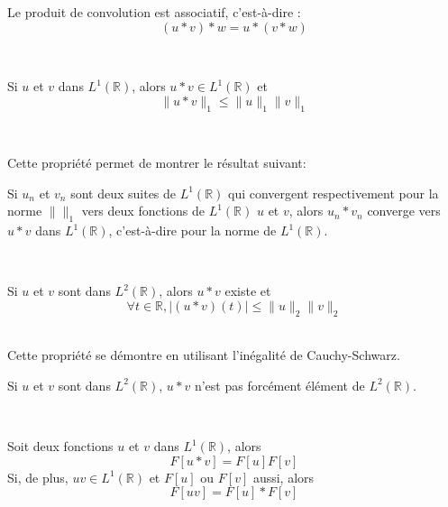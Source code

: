 \begin{prot} 
Le produit de convolution est associatif, c'est-à-dire :
$$(u*v)*w=u*(v*w)$$
\end{prot}
~~\

\begin{prot} 
Si $u$ et $v$ dans $L^1(\mathbb{R})$, alors $u*v \in L^1(\mathbb{R})$ et 
$$\|u*v\|_1\leq \|u\|_1 \|v\|_1$$
\end{prot}
~~\

Cette propriété permet de montrer le résultat suivant:

\begin{prot} 
Si $u_n$ et $v_n$ sont deux suites de $L^1(\mathbb{R})$ qui convergent respectivement pour la norme $\| \|_1$ vers deux fonctions de $L^1(\mathbb{R})$ $u$ et $v$, alors $u_n*v_n$ converge vers $u*v$ dans $L^1(\mathbb{R})$, c'est-à-dire pour la norme de $L^1(\mathbb{R})$.  
\end{prot}
~~\

\begin{prot} 
Si $u$ et $v$ sont dans $L^2(\mathbb{R})$, alors $u*v$ existe et 
$$\forall t \in \mathbb{R}, |(u*v)(t)|\leq \|u\|_2 \|v\|_2$$
\end{prot}
~~\\
Cette propriété se démontre en utilisant l'inégalité de Cauchy-Schwarz.
\\
\begin{rmq}
Si $u$ et $v$ sont dans $L^2(\mathbb{R})$, $u*v$ n'est pas forcément élément de $L^2(\mathbb{R})$.
\end{rmq}
~~\

\begin{prot} 
Soit deux fonctions $u$ et $v$ dans $L^1(\mathbb{R})$, alors
$$F[u*v]=F[u]F[v]$$
Si, de plus, $uv\in L^1(\mathbb{R})$ et $F[u]$ ou $F[v]$ aussi, alors
$$F[uv]=F[u]*F[v]$$
\end{prot}
~~\\

